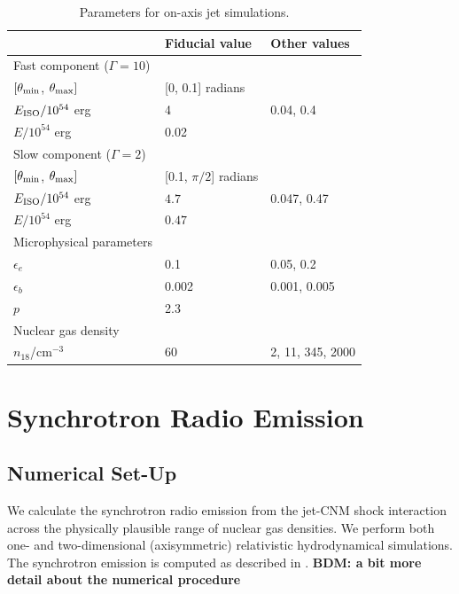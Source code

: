 \documentclass[usenatbib,fleqn]{mnras}
\begin{document}
\begin{table}
\begin{threeparttable}
  \caption{\label{tab:jetParams} Parameters for on-axis jet simulations.}
  \begin{tabular*}{0.95\columnwidth}{lll}
\hline
& Fiducial value & Other values \\
\hline\hline
    Fast component ($\Gamma=10$) &  &  \\ 
    \hline
    $[\theta_{\rm min}$, $\theta_{\rm max}]$ & [0, 0.1] radians & \\
    $E_{\rm ISO}/10^{54}$ erg & 4  & 0.04, 0.4\\
    $E/10^{54}$ erg & 0.02 & \\
    \hline 
    Slow component ($\Gamma=2$)\\
\hline
    $[\theta_{\rm min}$, $\theta_{\rm max}]$ & [0.1, $\pi/2$] radians
    & \\
    $E_{\rm ISO}/10^{54}$ erg & $4.7$ & 0.047, 0.47 \\
    $E/10^{54}$  erg & $0.47$ & \\
    \hline
    Microphysical parameters\\
\hline
    $\epsilon_e$ & 0.1 &  0.05, 0.2\\
    $\epsilon_b$ & 0.002 & 0.001, 0.005\\
    $p$ & 2.3\\
    \hline 
    Nuclear gas density \\
\hline
    $n_{18}$/cm$^{-3}$ & 60 & 2, 11, 345, 2000
  \end{tabular*}
\end{threeparttable}
\end{table}


\section{Synchrotron Radio Emission}

\label{sec:results}
\subsection{Numerical Set-Up}
\label{sec:numerical}
We calculate the synchrotron radio emission from the jet-CNM shock
interaction across the physically plausible range of nuclear gas
densities.  We perform both one- and two-dimensional (axisymmetric)
relativistic hydrodynamical simulations.  The synchrotron emission is
computed as described in \citet{Mimica+2015}.  {\bf BDM: a bit more
  detail about the numerical procedure}
\end{document}
